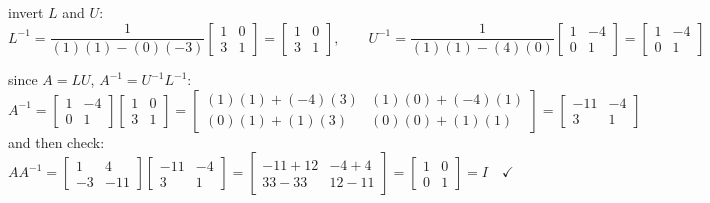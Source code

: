\documentclass[12pt]{article}
\begin{document}
invert $L$ and $U$:
\[
L^{-1} = \frac{1}{(1)(1) - (0)(-3)}\begin{bmatrix} 1 & 0 \\ 3 & 1 \end{bmatrix}
= \begin{bmatrix} 1 & 0 \\ 3 & 1 \end{bmatrix},
\qquad
U^{-1} = \frac{1}{(1)(1) - (4)(0)}\begin{bmatrix} 1 & -4 \\ 0 & 1 \end{bmatrix}
= \begin{bmatrix} 1 & -4 \\ 0 & 1 \end{bmatrix}
\]

since $A = LU$, $A^{-1} = U^{-1}L^{-1}$:
\[
A^{-1} = \begin{bmatrix} 1 & -4 \\ 0 & 1 \end{bmatrix}\begin{bmatrix} 1 & 0 \\ 3 & 1 \end{bmatrix}
= \begin{bmatrix} (1)(1) + (-4)(3) & (1)(0) + (-4)(1) \\ (0)(1) + (1)(3) & (0)(0) + (1)(1) \end{bmatrix}
= \begin{bmatrix} -11 & -4 \\ 3 & 1 \end{bmatrix}
\]
and then check:
\[
AA^{-1} = \begin{bmatrix} 1 & 4 \\ -3 & -11 \end{bmatrix}\begin{bmatrix} -11 & -4 \\ 3 & 1 \end{bmatrix}
= \begin{bmatrix} -11 + 12 & -4 + 4 \\ 33 - 33 & 12 - 11 \end{bmatrix}
= \begin{bmatrix} 1 & 0 \\ 0 & 1 \end{bmatrix} = I \quad \checkmark
\]
\end{document}
